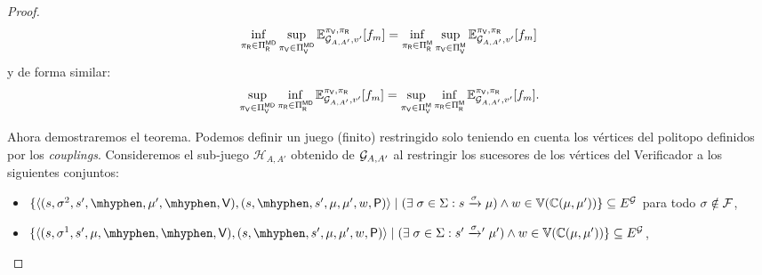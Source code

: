 \begin{proof}
\[
    \inf_{\pi_{\mathsf{R}} \in \Pi_{\mathsf{R}}^{\mathsf{M}\mathsf{D}}}  \sup_{\pi_{\mathsf{V}} \in \Pi_{\mathsf{V}}^{\mathsf{M}\mathsf{D}}} \mathbb{E}_{\mathcal{G}_{A,A'},v'}^{\pi_{\mathsf{V}},\pi_{\mathsf{R}}}[f_{m}] 
    =  \inf_{\pi_{\mathsf{R}} \in \Pi_{\mathsf{R}}^{\mathsf{M}}}  \sup_{\pi_{\mathsf{V}} \in \Pi_{\mathsf{V}}^{\mathsf{M}}} \mathbb{E}_{\mathcal{G}_{A,A'},v'}^{\pi_{\mathsf{V}},\pi_{\mathsf{R}}}[f_{m}]
\]
y de forma similar:
\[
    \sup_{\pi_{\mathsf{V}} \in \Pi_{\mathsf{V}}^{\mathsf{M}\mathsf{D}}}  \inf_{\pi_{\mathsf{R}} \in \Pi_{\mathsf{R}}^{\mathsf{M}\mathsf{D}}} \mathbb{E}_{\mathcal{G}_{A,A'},v'}^{\pi_{\mathsf{V}},\pi_{\mathsf{R}}}[f_{m}] 
    =  \sup_{\pi_{\mathsf{V}} \in \Pi_{\mathsf{V}}^{\mathsf{M}}}  \inf_{\pi_{\mathsf{R}} \in \Pi_{\mathsf{R}}^{\mathsf{M}}} \mathbb{E}_{\mathcal{G}_{A,A'},v'}^{\pi_{\mathsf{V}},\pi_{\mathsf{R}}}[f_{m}].
\]

    Ahora demostraremos el teorema.  Podemos definir un juego (finito) restringido solo teniendo en cuenta los vértices del politopo definidos por los \emph{couplings}.  Consideremos el sub-juego $\mathcal{H}_{A,A'}$ obtenido de $\mathcal{G}_{A,A'}$ al restringir los sucesores de los vértices del Verificador a los siguientes conjuntos:
\begin{itemize}
	\item $\{ \langle (s, \sigma^2, s', \mhyphen, \mu', \mhyphen, \Verifier), (s, \mhyphen, s', \mu, \mu', w, \Probabilistic) \rangle \mid (\exists\;\sigma \in \Sigma: s \xrightarrow{\sigma} \mu) \wedge   w \in \vertices{\couplings{\mu}{\mu'}}\} \subseteq E^\StochG$ para todo $\sigma \notin \mathcal{F}$,

 	 \item $\{ \langle (s, \sigma^1, s', \mu, \mhyphen, \mhyphen, \Verifier),(s, \mhyphen, s', \mu, \mu', w, \Probabilistic) \rangle \mid (\exists\;\sigma \in \Sigma: s' \xrightarrowprime{\sigma} \mu' ) \wedge  w \in \vertices{\couplings{\mu}{\mu'}} \} \subseteq E^\StochG$,
	 

\end{itemize}
\end{proof}
